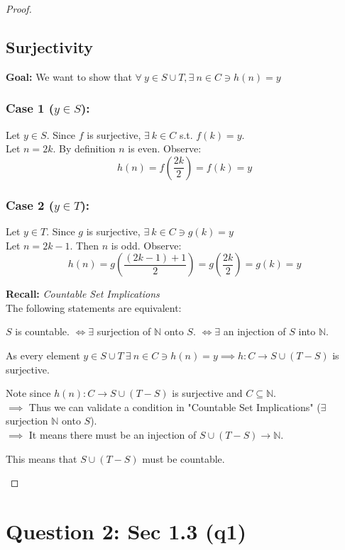 \documentclass[11pt]{article}
\theoremstyle{plain}
\begin{document}
\begin{proof}
	\subsection*{Surjectivity}
	\textbf{Goal:} We want to show that $\forall ~y \in S \cup T, \exists ~n \in C \ni h(n) = y$
	\subsubsection*{Case 1 ($y \in S$):}
	Let $y \in S$. Since $f$ is surjective, $\exists ~ k \in C$ s.t. $f(k) = y$. \\
	Let $n=2k$. By definition $n$ is even. Observe:
	\[
		h(n) = f(\frac{2k}{2}) = f(k) = y
	\]
	\subsubsection*{Case 2 ($y \in T$):}
	Let $y \in T$. Since $g$ is surjective, $\exists ~k \in C \ni g(k) = y$ \\
	Let $n=2k-1$. Then $n$ is odd. Observe:
	\[
		h(n) = g(\frac{(2k-1)+1}{2}) = g(\frac{2k}{2}) = g(k) = y
	\]
	\begin{blockquote}
		\textbf{Recall:} \textit{Countable Set Implications} \\
		The following statements are equivalent:
		\begin{center}
			$S$ is countable. $\iff \exists $ surjection of $\mathbb{N}$ onto $S$. $\iff \exists $ an injection of $S$ into $\mathbb{N}$.
		\end{center}
	\end{blockquote} \vspace{1em} \noindent
    \begin{center}
        As every element $y \in S \cup T ~\exists ~n \in C \ni h(n) = y \implies h: C \rightarrow S \cup (T-S)$ is surjective.
    \end{center}
	Note since $h(n): C \rightarrow S \cup (T-S)$ is surjective and $C \subseteq \mathbb{N}$. \\
	$\implies$ Thus we can validate a condition in "Countable Set Implications" ($\exists $ surjection $\mathbb{N}$ onto $S$). \\
	$\implies$ It means there must be an injection of $S \cup (T-S) \rightarrow \mathbb{N}$.
	\begin{center}
		This means that $S \cup (T-S)$ must be countable.
	\end{center}
\end{proof}
\section*{Question 2: Sec 1.3 (q1)}
\end{document}
